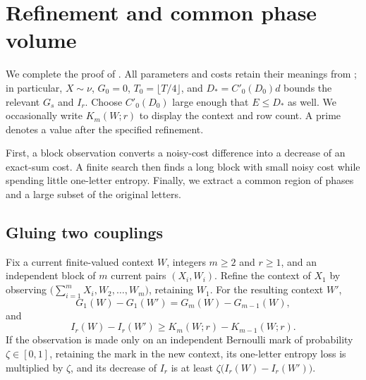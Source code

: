 \section{Refinement and common phase volume}
\label{sec:entropy-refinement}

We complete the proof of . All parameters and costs
retain their meanings from ; in particular,
$X\sim\nu$, $G_0=0$, $T_0=\lfloor T/4\rfloor$, and
$D_*=C'_0(D_0)d$ bounds the relevant $G_s$ and $I_r$.
Choose $C'_0(D_0)$ large enough that $E\le D_*$ as well.
We occasionally write $K_m(W;r)$ to display the context and row count.
A prime denotes a value after the specified refinement.

First, a block observation converts a noisy-cost difference into a decrease
of an exact-sum cost. A finite search then finds a long block with small noisy
cost while spending little one-letter entropy. Finally, we extract a common
region of phases and a large subset of the original letters.

\subsection{Gluing two couplings}

\begin{lemma}
\label{entropy-refinement:gluing}
Fix a current finite-valued context $W$, integers $m\ge2$ and $r\ge1$,
and an independent block of $m$ current pairs $(X_i,W_i)$.
Refine the context of $X_1$ by observing
$\bigl(\sum_{i=1}^mX_i,W_2,\ldots,W_m\bigr)$, retaining $W_1$.
For the resulting context $W'$,
\begin{equation}
 G_1(W)-G_1(W')=G_m(W)-G_{m-1}(W),
 \label{entropy-refinement:one-letter-loss}
\end{equation}
and
\begin{equation}
 I_r(W)-I_r(W')\ge K_m(W;r)-K_{m-1}(W;r).
 \label{eq:source-4}
\end{equation}
If the observation is made only on an independent Bernoulli mark of
probability $\zeta\in[0,1]$, retaining the mark in the new context, its
one-letter entropy loss is multiplied by $\zeta$, and its decrease of
$I_r$ is at least $\zeta\bigl(I_r(W)-I_r(W')\bigr)$.
\end{lemma}

